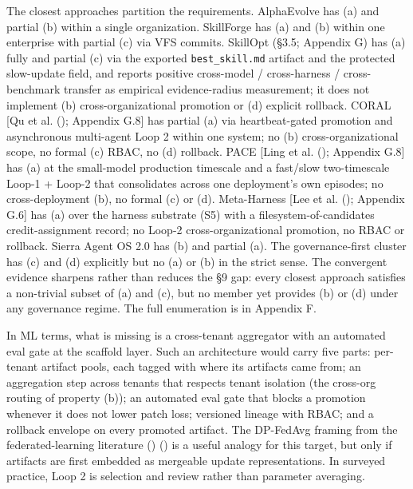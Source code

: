 \documentclass[
]{article}
\begin{document}
The closest approaches partition the requirements. AlphaEvolve has (a)
and partial (b) within a single organization. SkillForge has (a) and (b)
within one enterprise with partial (c) via VFS commits. SkillOpt (§3.5;
Appendix G) has (a) fully and partial (c) via the exported
\texttt{best\_skill.md} artifact and the protected slow-update field,
and reports positive cross-model / cross-harness / cross-benchmark
transfer as empirical evidence-radius measurement; it does not implement
(b) cross-organizational promotion or (d) explicit rollback. CORAL {[}Qu
et al. (); Appendix G.8{]} has partial
(a) via heartbeat-gated promotion and asynchronous multi-agent Loop 2
within one system; no (b) cross-organizational scope, no formal (c)
RBAC, no (d) rollback. PACE {[}Ling et al.
(); Appendix G.8{]} has (a) at the
small-model production timescale and a fast/slow two-timescale Loop-1 +
Loop-2 that consolidates across one deployment's own episodes; no
cross-deployment (b), no formal (c) or (d). Meta-Harness {[}Lee et al.
(); Appendix G.6{]} has (a) over
the harness substrate (S5) with a filesystem-of-candidates
credit-assignment record; no Loop-2 cross-organizational promotion, no
RBAC or rollback. Sierra Agent OS 2.0 has (b) and partial (a). The
governance-first cluster has (c) and (d) explicitly but no (a) or (b) in
the strict sense. The convergent evidence sharpens rather than reduces
the §9 gap: every closest approach satisfies a non-trivial subset of (a)
and (c), but no member yet provides (b) or (d) under any governance
regime. The full enumeration is in Appendix F.

In ML terms, what is missing is a cross-tenant aggregator with an
automated eval gate at the scaffold layer. Such an architecture would
carry five parts: per-tenant artifact pools, each tagged with where its
artifacts came from; an aggregation step across tenants that respects
tenant isolation (the cross-org routing of property (b)); an automated
eval gate that blocks a promotion whenever it does not lower patch loss;
versioned lineage with RBAC; and a rollback envelope on every promoted
artifact. The DP-FedAvg framing from the federated-learning literature
()
() is a useful
analogy for this target, but only if artifacts are first embedded as
mergeable update representations. In surveyed practice, Loop 2 is
selection and review rather than parameter averaging.
\end{document}
